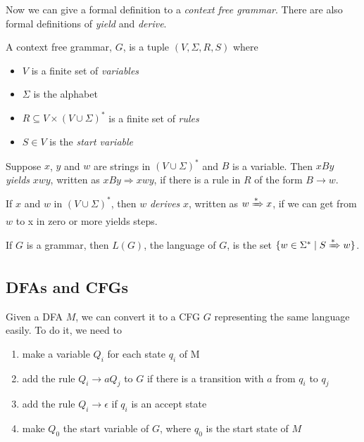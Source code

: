\documentclass[11pt]{article}
\begin{document}
Now we can give a formal definition to a \emph{context free grammar}. There are also formal
definitions of \emph{yield} and \emph{derive}.

\begin{definition}
A context free grammar, $G$, is a tuple $(V,\Sigma,R,S)$ where
\begin{itemize}
\item $V$ is a finite set of \emph{variables}
\item $\Sigma$ is the alphabet
\item $R \subseteq V \times (V \cup \Sigma)^\ast$ is a finite set of \emph{rules}
\item $S \in V$ is the \emph{start variable}
\end{itemize}
\end{definition}

\begin{definition}
Suppose $x$, $y$ and $w$ are strings in $(V \cup \Sigma)^\ast$ and $B$ is a variable. Then
$xBy$ \emph{yields} $xwy$, written as $xBy \Rightarrow xwy$, if there is a rule in $R$ of the form
$B \rightarrow w$.
\end{definition}

\begin{definition}
If $x$ and $w$ in $(V \cup \Sigma)^\ast$, then $w$ \emph{derives} $x$, written as $w \xRightarrow
{\ast} x$, if we can get from $w$ to x in zero or more yields steps.
\end{definition}

\begin{definition}
If $G$ is a grammar, then $L(G)$, the language of $G$, is the set $\{w \in \Sigma^\ast \mid
S \xRightarrow{\ast} w\}$.
\end{definition}

\subsection{DFAs and CFGs}

Given a DFA $M$, we can convert it to a CFG $G$ representing the same language easily. To do it,
we need to
\begin{enumerate}
\item make a variable $Q_i$ for each state $q_i$ of M
\item add the rule $Q_i \rightarrow aQ_j$ to $G$ if there is a transition with $a$ from $q_i$ to
$q_j$
\item add the rule $Q_i \rightarrow \epsilon$ if $q_i$ is an accept state
\item make $Q_0$ the start variable of $G$, where $q_0$ is the start state of $M$
\end{enumerate}
\end{document}
